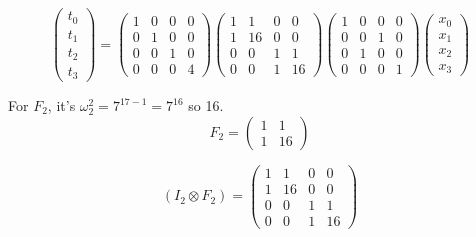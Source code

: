 \documentclass{article}
\begin{document}
	\begin{equation}
		\begin{pmatrix}
			t_0 \\
			t_1 \\
			t_2 \\
			t_3
		\end{pmatrix}
		= 
		\begin{pmatrix}
			1 & 0 & 0 & 0 \\
			0 & 1 & 0 & 0 \\
			0 & 0 & 1 & 0 \\
			0 & 0 & 0 & 4
		\end{pmatrix}
		\begin{pmatrix}
			1 & 1 & 0 & 0 \\
			1 & 16 & 0 & 0 \\
			0 & 0 & 1 & 1 \\
			0 & 0 & 1 & 16
		\end{pmatrix}
		\begin{pmatrix}
			1 & 0 & 0 & 0 \\
			0 & 0 & 1 & 0 \\
			0 & 1 & 0 & 0 \\
			0 & 0 & 0 & 1
		\end{pmatrix}
		\begin{pmatrix}
			x_0 \\
			x_1 \\
			x_2 \\
			x_3
		\end{pmatrix}
	\end{equation}

	For $F_2$, it's $\omega_2^2 = 7^{17-1}=7^16$ so 16.
	\begin{equation}
		F_2=\begin{pmatrix}
			1 & 1 \\
			1 & 16
		\end{pmatrix}
	\end{equation}
	
	\begin{equation}
		(I_2 \otimes F_2) = \begin{pmatrix}
			1 & 1 & 0 & 0\\
			1 & 16 & 0 & 0\\
			0 & 0 & 1 & 1 \\
			0 & 0 & 1 & 16
		\end{pmatrix}
	\end{equation}
	
\end{document}
